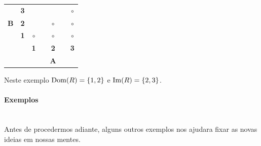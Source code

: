 \begin{table}[h]
\centering
\begin{tabular}{ccccccc}
\multicolumn{1}{c}{       } &  \multicolumn{1}{c|}{{\bf 3}} & \frame{$\circ$} & \quad& \frame{$\circ$} &\quad & $\circ$  \\
\multicolumn{1}{c}{{\bf B}} &  \multicolumn{1}{c|}{{\bf 2}} & \frame{$\circ$} & \quad& $\circ$         &\quad & $\circ$  \\
\multicolumn{1}{c}{       } &  \multicolumn{1}{c|}{{\bf 1}} & $\circ$         & \quad& $\circ$         &\quad & $\circ$  \\\cline{3-7}
                            &                               & {\bf 1} & \quad& {\bf 2} &\quad & {\bf 3}   \\
                            &                               &         & \quad& {\bf A} &\quad &           \\
\end{tabular}
\end{table}
Neste exemplo $\operatorname{Dom}(R)=\{1,2\}$ e $\operatorname{Im}(R)=\{2,3\}$.

\paragraph{{\bf Exemplos}}
\quad\\[0.3cm]
Antes de procedermos adiante, alguns outros exemplos nos ajudar\ao a fixar as novas ideias em nossas mentes.

